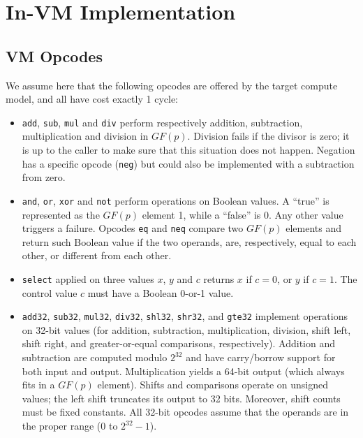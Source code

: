 \documentclass{llncs}
\newcommand{\GF}{GF}
\begin{document}
\section{In-VM Implementation}

\subsection{VM Opcodes}

We assume here that the following opcodes are offered by the target
compute model, and all have cost exactly 1 cycle:
\begin{itemize}

    \item \verb+add+, \verb+sub+, \verb+mul+ and \verb+div+ perform
    respectively addition, subtraction, multiplication and division
    in $\GF(p)$. Division fails if the divisor is zero; it is up to
    the caller to make sure that this situation does not happen.
    Negation has a specific opcode (\verb+neg+) but could also be
    implemented with a subtraction from zero.

    \item \verb+and+, \verb+or+, \verb+xor+ and \verb+not+ perform
    operations on Boolean values. A ``true'' is represented as the
    $\GF(p)$ element 1, while a ``false'' is 0. Any other value triggers
    a failure. Opcodes \verb+eq+ and \verb+neq+ compare two $\GF(p)$
    elements and return such Boolean value if the two operands, are,
    respectively, equal to each other, or different from each other.

    \item \verb+select+ applied on three values $x$, $y$ and $c$
    returns $x$ if $c = 0$, or $y$ if $c = 1$. The control value $c$
    must have a Boolean 0-or-1 value.

    \item \verb+add32+, \verb+sub32+, \verb+mul32+, \verb+div32+,
    \verb+shl32+, \verb+shr32+, and \verb+gte32+ implement operations on
    32-bit values (for addition, subtraction, multiplication, division,
    shift left, shift right, and greater-or-equal comparisons,
    respectively). Addition and subtraction are computed modulo $2^{32}$
    and have carry/borrow support for both input and output.
    Multiplication yields a 64-bit output (which always fits in a
    $\GF(p)$ element). Shifts and comparisons operate on unsigned
    values; the left shift truncates its output to 32 bits. Moreover,
    shift counts must be fixed constants. All 32-bit opcodes assume that
    the operands are in the proper range (0 to $2^{32}-1$).

\end{itemize}
\end{document}

